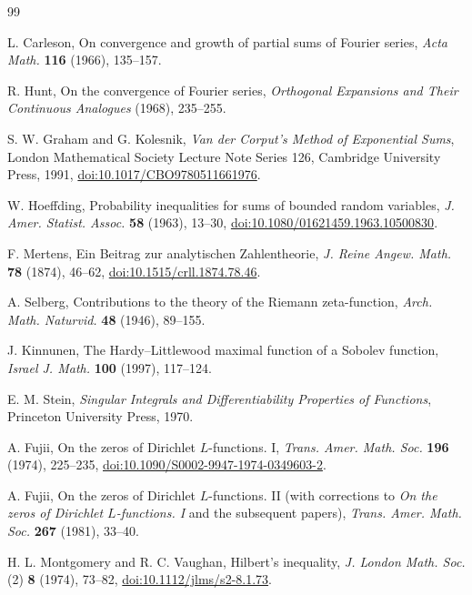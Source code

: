 \documentclass[11pt,reqno]{amsart}
\numberwithin{equation}{section}
\begin{document}
\begin{thebibliography}{99}

 L. Carleson, On convergence and growth of partial sums of Fourier series, \emph{Acta Math.} \textbf{116} (1966), 135--157.

 R. Hunt, On the convergence of Fourier series, \emph{Orthogonal Expansions and Their Continuous Analogues} (1968), 235--255.

S. W. Graham and G. Kolesnik, \emph{Van der Corput's Method of Exponential Sums},
London Mathematical Society Lecture Note Series 126, Cambridge University Press, 1991,
\href{https://doi.org/10.1017/CBO9780511661976}{doi:10.1017/CBO9780511661976}.

W. Hoeffding, Probability inequalities for sums of bounded random variables,
\emph{J. Amer. Statist. Assoc.} \textbf{58} (1963), 13--30,
\href{https://doi.org/10.1080/01621459.1963.10500830}{doi:10.1080/01621459.1963.10500830}.

F. Mertens, Ein Beitrag zur analytischen Zahlentheorie,
\emph{J. Reine Angew. Math.} \textbf{78} (1874), 46--62,
\href{https://doi.org/10.1515/crll.1874.78.46}{doi:10.1515/crll.1874.78.46}.

A. Selberg, Contributions to the theory of the Riemann zeta-function,
\emph{Arch. Math. Naturvid.} \textbf{48} (1946), 89--155.

J. Kinnunen, The Hardy--Littlewood maximal function of a Sobolev function,
\emph{Israel J. Math.} \textbf{100} (1997), 117--124.

E. M. Stein, \emph{Singular Integrals and Differentiability Properties of Functions},
Princeton University Press, 1970.

 A. Fujii, On the zeros of Dirichlet $L$-functions. I, \emph{Trans. Amer. Math. Soc.} \textbf{196} (1974), 225--235, \href{https://doi.org/10.1090/S0002-9947-1974-0349603-2}{doi:10.1090/S0002-9947-1974-0349603-2}.

 A. Fujii, On the zeros of Dirichlet $L$-functions. II (with corrections to \emph{On the zeros of Dirichlet $L$-functions. I} and the subsequent papers), \emph{Trans. Amer. Math. Soc.} \textbf{267} (1981), 33--40.

 H. L. Montgomery and R. C. Vaughan, Hilbert's inequality, \emph{J. London Math. Soc.} (2) \textbf{8} (1974), 73--82, \href{https://doi.org/10.1112/jlms/s2-8.1.73}{doi:10.1112/jlms/s2-8.1.73}.


\end{thebibliography}
\end{document}
